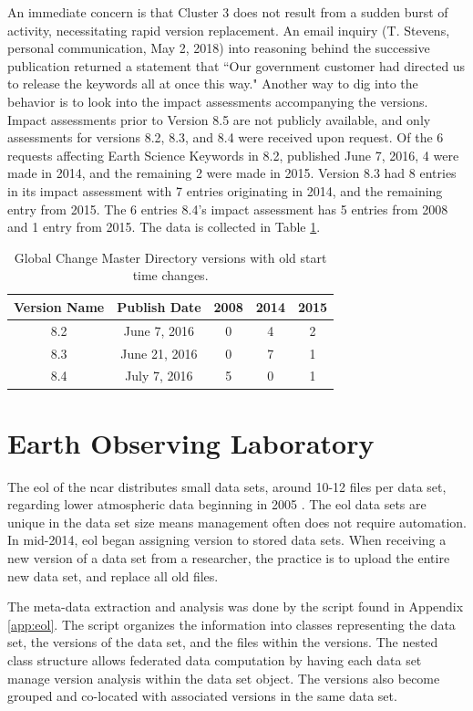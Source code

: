 An immediate concern is that Cluster 3 does not result from a sudden burst of activity, necessitating rapid \gls{version} replacement.
An email inquiry (T. Stevens, personal communication, May 2, 2018) into reasoning behind the successive publication returned a statement that ``Our government customer had directed us to release the keywords all at once this way."
Another way to dig into the behavior is to look into the impact assessments accompanying the versions.
Impact assessments prior to Version 8.5 are not publicly available, and only assessments for versions 8.2, 8.3, and 8.4 were received upon request.
Of the 6 requests affecting Earth Science Keywords in 8.2, published June 7, 2016, 4 were made in 2014, and the remaining 2 were made in 2015.
Version 8.3 had 8 entries in its impact assessment with 7 entries originating in 2014, and the remaining entry from 2015.
The 6 entries 8.4’s impact assessment has 5 entries from 2008 and 1 entry from 2015.
The data is collected in Table \ref{table:GCMD_old}.
\begin{table}
	\caption{Global Change Master Directory versions with old start time changes.}
	\label{table:GCMD_old}
	\centering
	\begin{tabular}{|c|c|c|c|c|}
		\hline
		Version Name&	Publish Date&	2008&	2014&	2015\\ \hline
		8.2&	June 7, 2016&	0&	4&	2\\
		8.3&	June 21, 2016&	0&	7&	1\\
		8.4&	July 7, 2016&	5&	0&	1\\
		\hline
	\end{tabular}
\end{table}


\section{Earth Observing Laboratory}

The \gls{eol} of the \gls{ncar} distributes small data sets, around 10-12 files per data set, regarding lower atmospheric data beginning in 2005 \cite{EOL}.
The \gls{eol} data sets are unique in the data set size means management often does not require automation.
In mid-2014, \gls{eol} began assigning \gls{version} to stored data sets.
When receiving a new \gls{version} of a data set from a researcher, the practice is to upload the entire new data set, and replace all old files.

The meta-data extraction and analysis was done by the script found in Appendix \ref{app:eol}.
The script organizes the information into classes representing the data set, the versions of the data set, and the files within the versions.
The nested class structure allows federated data computation by having each data set manage version analysis within the data set object.
The versions also become grouped and co-located with associated versions in the same data set.

